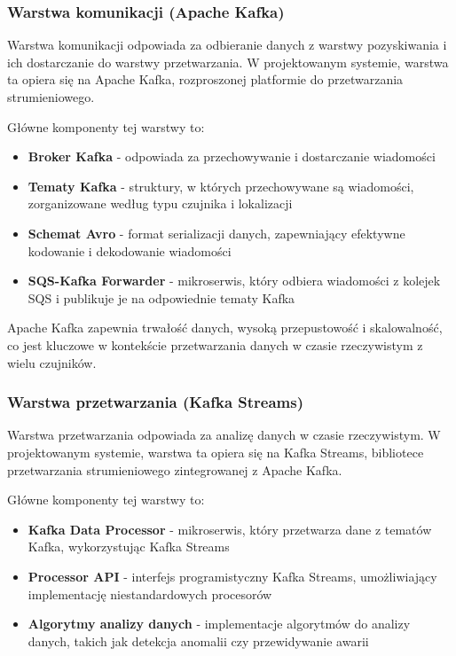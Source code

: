 \subsubsection{Warstwa komunikacji (Apache Kafka)}
\label{subsubsec:warstwa_komunikacji}

Warstwa komunikacji odpowiada za odbieranie danych z warstwy pozyskiwania i ich dostarczanie do warstwy przetwarzania. W projektowanym systemie, warstwa ta opiera się na Apache Kafka, rozproszonej platformie do przetwarzania strumieniowego.

Główne komponenty tej warstwy to:

\begin{itemize}
    \item \textbf{Broker Kafka} - odpowiada za przechowywanie i dostarczanie wiadomości
    \item \textbf{Tematy Kafka} - struktury, w których przechowywane są wiadomości, zorganizowane według typu czujnika i lokalizacji
    \item \textbf{Schemat Avro} - format serializacji danych, zapewniający efektywne kodowanie i dekodowanie wiadomości
    \item \textbf{SQS-Kafka Forwarder} - mikroserwis, który odbiera wiadomości z kolejek SQS i publikuje je na odpowiednie tematy Kafka
\end{itemize}

Apache Kafka zapewnia trwałość danych, wysoką przepustowość i skalowalność, co jest kluczowe w kontekście przetwarzania danych w czasie rzeczywistym z wielu czujników.

\subsubsection{Warstwa przetwarzania (Kafka Streams)}
\label{subsubsec:warstwa_przetwarzania}

Warstwa przetwarzania odpowiada za analizę danych w czasie rzeczywistym. W projektowanym systemie, warstwa ta opiera się na Kafka Streams, bibliotece przetwarzania strumieniowego zintegrowanej z Apache Kafka.

Główne komponenty tej warstwy to:

\begin{itemize}
    \item \textbf{Kafka Data Processor} - mikroserwis, który przetwarza dane z tematów Kafka, wykorzystując Kafka Streams
    \item \textbf{Processor API} - interfejs programistyczny Kafka Streams, umożliwiający implementację niestandardowych procesorów
    \item \textbf{Algorytmy analizy danych} - implementacje algorytmów do analizy danych, takich jak detekcja anomalii czy przewidywanie awarii
\end{itemize}

